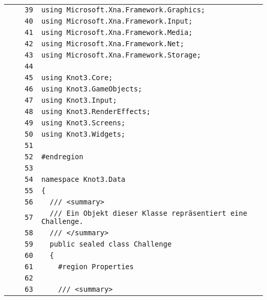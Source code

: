\documentclass[a4paper,10pt]{article}
\begin{document}
\begin{longtable}[l]{lrrl}
\cellcolor{gray} &  & \verb~39~ & \verb~using Microsoft.Xna.Framework.Graphics;~\\
\cellcolor{gray} &  & \verb~40~ & \verb~using Microsoft.Xna.Framework.Input;~\\
\cellcolor{gray} &  & \verb~41~ & \verb~using Microsoft.Xna.Framework.Media;~\\
\cellcolor{gray} &  & \verb~42~ & \verb~using Microsoft.Xna.Framework.Net;~\\
\cellcolor{gray} &  & \verb~43~ & \verb~using Microsoft.Xna.Framework.Storage;~\\
\cellcolor{gray} &  & \verb~44~ & \verb~~\\
\cellcolor{gray} &  & \verb~45~ & \verb~using Knot3.Core;~\\
\cellcolor{gray} &  & \verb~46~ & \verb~using Knot3.GameObjects;~\\
\cellcolor{gray} &  & \verb~47~ & \verb~using Knot3.Input;~\\
\cellcolor{gray} &  & \verb~48~ & \verb~using Knot3.RenderEffects;~\\
\cellcolor{gray} &  & \verb~49~ & \verb~using Knot3.Screens;~\\
\cellcolor{gray} &  & \verb~50~ & \verb~using Knot3.Widgets;~\\
\cellcolor{gray} &  & \verb~51~ & \verb~~\\
\cellcolor{gray} &  & \verb~52~ & \verb~#endregion~\\
\cellcolor{gray} &  & \verb~53~ & \verb~~\\
\cellcolor{gray} &  & \verb~54~ & \verb~namespace Knot3.Data~\\
\cellcolor{gray} &  & \verb~55~ & \verb~{~\\
\cellcolor{gray} &  & \verb~56~ & \verb~  /// <summary>~\\
\cellcolor{gray} &  & \verb~57~ & \verb~  /// Ein Objekt dieser Klasse repräsentiert eine Challenge.~\\
\cellcolor{gray} &  & \verb~58~ & \verb~  /// </summary>~\\
\cellcolor{gray} &  & \verb~59~ & \verb~  public sealed class Challenge~\\
\cellcolor{gray} &  & \verb~60~ & \verb~  {~\\
\cellcolor{gray} &  & \verb~61~ & \verb~    #region Properties~\\
\cellcolor{gray} &  & \verb~62~ & \verb~~\\
\cellcolor{gray} &  & \verb~63~ & \verb~    /// <summary>~\\

\end{longtable}
\end{document}
